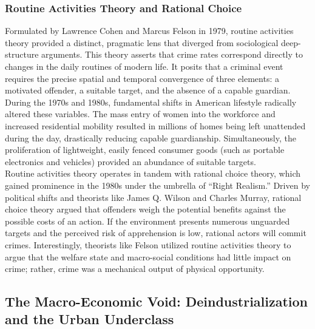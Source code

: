 \documentclass[
]{article}
\begin{document}
\subsubsection{\texorpdfstring{\textbf{Routine Activities Theory and
Rational
Choice}}{Routine Activities Theory and Rational Choice}}\label{routine-activities-theory-and-rational-choice}

Formulated by Lawrence Cohen and Marcus Felson in 1979, routine
activities theory provided a distinct, pragmatic lens that diverged from
sociological deep-structure arguments. This theory asserts that crime
rates correspond directly to changes in the daily routines of modern
life. It posits that a criminal event requires the precise spatial and
temporal convergence of three elements: a motivated offender, a suitable
target, and the absence of a capable guardian.\\
During the 1970s and 1980s, fundamental shifts in American lifestyle
radically altered these variables. The mass entry of women into the
workforce and increased residential mobility resulted in millions of
homes being left unattended during the day, drastically reducing capable
guardianship. Simultaneously, the proliferation of lightweight, easily
fenced consumer goods (such as portable electronics and vehicles)
provided an abundance of suitable targets.\\
Routine activities theory operates in tandem with rational choice
theory, which gained prominence in the 1980s under the umbrella of
``Right Realism.'' Driven by political shifts and theorists like James
Q. Wilson and Charles Murray, rational choice theory argued that
offenders weigh the potential benefits against the possible costs of an
action. If the environment presents numerous unguarded targets and the
perceived risk of apprehension is low, rational actors will commit
crimes. Interestingly, theorists like Felson utilized routine activities
theory to argue that the welfare state and macro-social conditions had
little impact on crime; rather, crime was a mechanical output of
physical opportunity.

\subsection{\texorpdfstring{\textbf{The Macro-Economic Void:
Deindustrialization and the Urban
Underclass}}{The Macro-Economic Void: Deindustrialization and the Urban Underclass}}\label{the-macro-economic-void-deindustrialization-and-the-urban-underclass}
\end{document}
